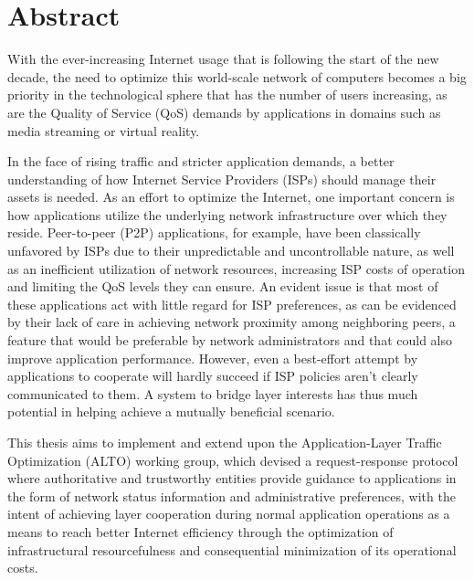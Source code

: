 \chapter{Abstract}

    With the ever-increasing Internet usage that is following the start of the new decade, the need to optimize this world-scale network of computers becomes a big priority in the technological sphere that has the number of users increasing, as are the Quality of Service (QoS) demands by applications in domains such as media streaming or virtual reality.

    In the face of rising traffic and stricter application demands, a better understanding of how Internet Service Providers (ISPs) should manage their assets is needed.
    As an effort to optimize the Internet, one important concern is how applications utilize the underlying network infrastructure over which they reside.
    Peer-to-peer (P2P) applications, for example, have been classically unfavored by ISPs due to their unpredictable and uncontrollable nature, as well as an inefficient utilization of network resources, increasing ISP costs of operation and limiting the QoS levels they can ensure.
    An evident issue is that most of these applications act with little regard for ISP preferences, as can be evidenced by their lack of care in achieving network proximity among neighboring peers, a feature that would be preferable by network administrators and that could also improve application performance.
    However, even a best-effort attempt by applications to cooperate will hardly succeed if ISP policies aren't clearly communicated to them.
    A system to bridge layer interests has thus much potential in helping achieve a mutually beneficial scenario.

    This thesis aims to implement and extend upon the Application-Layer Traffic Optimization (ALTO) working group, which devised a request-response protocol where authoritative and trustworthy entities provide guidance to applications in the form of network status information and administrative preferences, with the intent of achieving layer cooperation during normal application operations as a means to reach better Internet efficiency through the optimization of infrastructural resourcefulness and consequential minimization of its operational costs.

